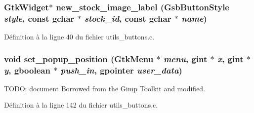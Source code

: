 \subsubsection[{new\_\-stock\_\-image\_\-label}]{\setlength{\rightskip}{0pt plus 5cm}GtkWidget$\ast$ new\_\-stock\_\-image\_\-label ({\bf GsbButtonStyle} {\em style}, \/  const gchar $\ast$ {\em stock\_\-id}, \/  const gchar $\ast$ {\em name})}\label{utils__buttons_8h_a239d96ea80c3728beec14f95995cabef}


Définition à la ligne 40 du fichier utils\_\-buttons.c.

\subsubsection[{set\_\-popup\_\-position}]{\setlength{\rightskip}{0pt plus 5cm}void set\_\-popup\_\-position (GtkMenu $\ast$ {\em menu}, \/  gint $\ast$ {\em x}, \/  gint $\ast$ {\em y}, \/  gboolean $\ast$ {\em push\_\-in}, \/  gpointer {\em user\_\-data})}\label{utils__buttons_8h_a99ce5771bb0e5986914ff73a90ced973}
TODO: document Borrowed from the Gimp Toolkit and modified. 

Définition à la ligne 142 du fichier utils\_\-buttons.c.


